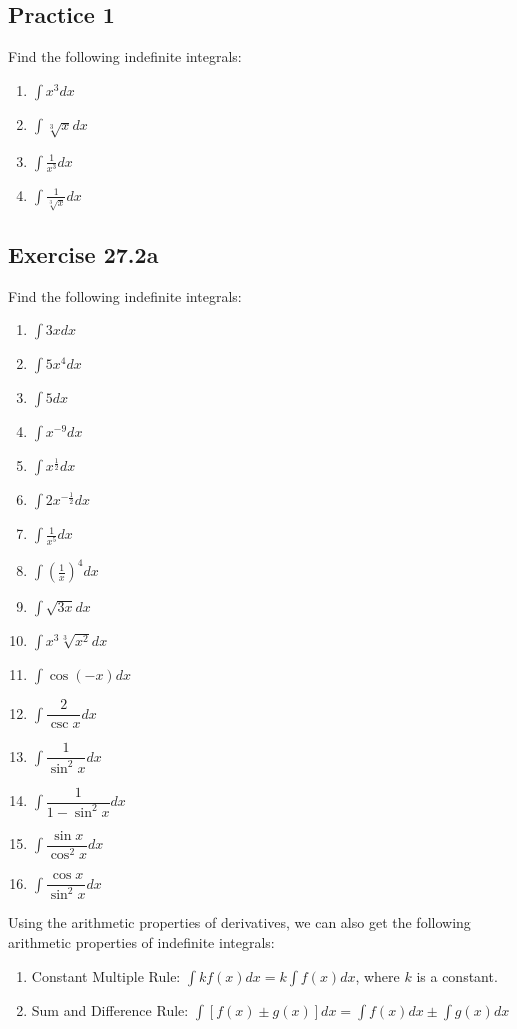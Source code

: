 \documentclass{report}
\begin{document}
\subsection{Practice 1}
Find the following indefinite integrals:
\begin{enumerate}
    \item $\displaystyle\int x^{3}dx$
    \item $\displaystyle\int{\sqrt[3]{x}}dx$
    \item $\displaystyle\int{\frac{1}{x^{3}}}dx$
    \item $\displaystyle\int{\frac{1}{\sqrt[3]{x}}}dx$
\end{enumerate}

\subsection{Exercise 27.2a}
Find the following indefinite integrals:
\begin{enumerate}
    \item $\displaystyle\int3xdx$
    \item $\displaystyle\int5x^{4}dx$
    \item $\displaystyle\int5dx$
    \item $\displaystyle\int x^{-9}dx$
    \item $\displaystyle\int x^{\frac{1}{2}}dx$
    \item $\displaystyle\int{2x^{-{\frac{1}{2}}}dx}$
    \item $\displaystyle\int{\frac{1}{x^5}}dx$
    \item $\displaystyle\int{\left(\frac{1}{x}\right)}^{4}dx$
    \item $\displaystyle\int{\sqrt{3x}}dx$
    \item $\displaystyle\int{x^3\sqrt[3]{x^2}}dx$
    \item $\displaystyle\int{\cos(-x)}dx$
    \item $\displaystyle\int{\dfrac{2}{\csc x}}dx$
    \item $\displaystyle\int{\dfrac{1}{\sin^2x}}dx$
    \item $\displaystyle\int{\dfrac{1}{1 - \sin^2x}}dx$
    \item $\displaystyle\int{\dfrac{\sin x}{\cos^2x}}dx$
    \item $\displaystyle\int{\dfrac{\cos x}{\sin^2x}}dx$
\end{enumerate}

\newpage

Using the arithmetic properties of derivatives, we can also get the following
arithmetic properties of indefinite integrals:
\begin{mdframed}[style=MyFrame]
    \begin{enumerate}
        \item Constant Multiple Rule: $\displaystyle\int kf(x)dx = k\int f(x)dx$, where $k$
              is a constant.
        \item Sum and Difference Rule: $\displaystyle\int \left[f(x) \pm g(x)\right]dx = \int
                  f(x)dx \pm \int g(x)dx$
    \end{enumerate}
\end{mdframed}
\end{document}
